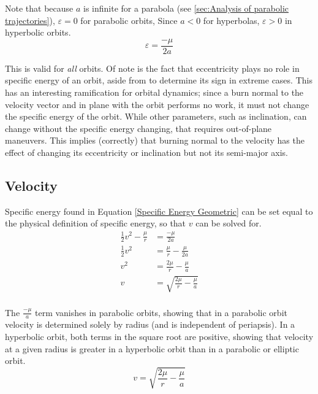 \documentclass{article}
\begin{document}
Note that because $a$ is infinite for a parabola (see \ref{sec:Analysis of parabolic trajectories}), $\varepsilon=0$ for parabolic orbits, Since $a<0$ for hyperbolas, $\varepsilon>0$ in hyperbolic orbits.
\begin{equation}\label{Specific Energy Geometric}
    \varepsilon=\frac{-\mu}{2a}
\end{equation}

This is valid for \textit{all} orbits. Of note is the fact that eccentricity plays no role in specific energy of an orbit, aside from to determine its sign in extreme cases. This has an interesting ramification for orbital dynamics; since a burn normal to the velocity vector and in plane with the orbit performs no work, it must not change the specific energy of the orbit. While other parameters, such as inclination, can change without the specific energy changing, that requires out-of-plane maneuvers. This implies (correctly) that burning normal to the velocity has the effect of changing its eccentricity or inclination but not its semi-major axis.

\bigskip\bigskip
\subsection{Velocity}\label{sec:Velocity}

Specific energy found in Equation \eqref{Specific Energy Geometric} can be set equal to the physical definition of specific energy, so that $v$ can be solved for.
\begin{align*}
    \frac{1}{2}v^2-\frac{\mu}{r} & =\frac{-\mu}{2a}                     \\
    \frac{1}{2}v^2               & =\frac{\mu}{r}-\frac{\mu}{2a}        \\
    v^2                          & =\frac{2\mu}{r}-\frac{\mu}{a}        \\
    v                            & =\sqrt{\frac{2\mu}{r}-\frac{\mu}{a}} \\
\end{align*}

The $\frac{-\mu}{a}$ term vanishes in parabolic orbits, showing that in a parabolic orbit velocity is determined solely by radius (and is independent of periapsis). In a hyperbolic orbit, both terms in the square root are positive, showing that velocity at a given radius is greater in a hyperbolic orbit than in a parabolic or elliptic orbit.
\begin{equation}\label{Vis-Viva Equation}
    v= \sqrt{\frac{2\mu}{r}-\frac{\mu}{a}}
\end{equation}
\end{document}
